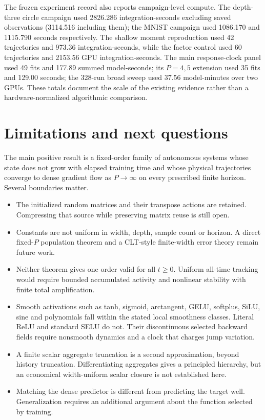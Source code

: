 \documentclass[11pt]{article}
\theoremstyle{definition}
\theoremstyle{remark}
\begin{document}
The frozen experiment record also reports campaign-level compute.  The
depth-three circle campaign used 2826.286 integration-seconds excluding saved
observations (3114.516 including them); the MNIST campaign used 1086.170 and
1115.790 seconds respectively.  The shallow moment reproduction used 42
trajectories and 973.36 integration-seconds, while the factor control used 60
trajectories and 2153.56 GPU integration-seconds.  The main response-clock panel
used 49 fits and 177.89 summed model-seconds; its $P=4,5$ extension used 35 fits
and 129.00 seconds; the 328-run broad sweep used 37.56 model-minutes over two
GPUs.  These totals document the scale of the existing evidence rather than a
hardware-normalized algorithmic comparison.

\section{Limitations and next questions}

The main positive result is a fixed-order family of autonomous systems whose
state does not grow with elapsed training time and whose physical trajectories
converge to dense gradient flow as $P\to\infty$ on every prescribed finite
horizon.  Several boundaries matter.

\begin{itemize}
\item The initialized random matrices and their transpose actions are retained.
Compressing that source while preserving matrix reuse is still open.
\item Constants are not uniform in width, depth, sample count or horizon.  A
direct fixed-$P$ population theorem and a CLT-style finite-width error theory
remain future work.
\item Neither theorem gives one order valid for all $t\ge0$.  Uniform all-time
tracking would require bounded accumulated activity and nonlinear stability
with finite total amplification.
\item Smooth activations such as tanh, sigmoid, arctangent, GELU, softplus,
SiLU, sine and polynomials fall within the stated local smoothness classes.
Literal ReLU and standard SELU do not.  Their discontinuous selected backward
fields require nonsmooth dynamics and a clock that charges jump variation.
\item A finite scalar aggregate truncation is a second approximation, beyond
history truncation.  Differentiating aggregates gives a principled hierarchy,
but an economical width-uniform scalar closure is not established here.
\item Matching the dense predictor is different from predicting the target
well.  Generalization requires an additional argument about the function
selected by training.
\end{itemize}
\end{document}
